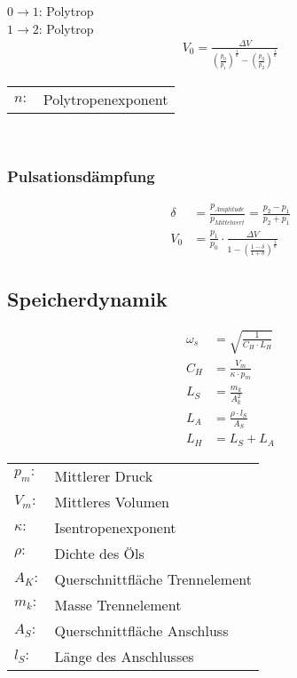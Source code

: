 $0 \rightarrow 1$: Polytrop \\
 $1 \rightarrow 2$: Polytrop
\begin{align*}
V_0 = \frac{\Delta V}{\left( \frac{p_0}{p_1} \right)^{\frac{1}{n}} - \left( \frac{p_0}{p_2} \right)^{\frac{1}{n}}}
\end{align*}

\begin{tabular}{ll}
$n:$ & Polytropenexponent
\end{tabular} \\



\subsubsection{Pulsationsdämpfung}
\begin{align*}
\delta &= \frac{p_{Amplitude}}{p_{Mittelwert}} = \frac{p_2 - p_1}{p_2 + p_1} \\
V_0 &= \frac{p_1}{p_0} \cdot \frac{\Delta V}{1 - \left( \frac{1-\delta}{1+\delta}\right)^{\frac{1}{n}}}
\end{align*}


\subsection{Speicherdynamik}
\begin{align*}
\omega_s &= \sqrt{\frac{1}{C_H \cdot L_H}} \tag{Eigenfrequenz} \\
C_H &= \frac{V_m}{\kappa \cdot p_m} \tag{Speicherkapazität} \\
L_S &= \frac{m_k}{A_k^2} \tag{Speicherinduktivität} \\
L_A &= \frac{\rho \cdot l_S}{A_S} \tag{Anschlussinduktivität} \\
L_H &= L_S + L_A
\end{align*}

\begin{tabular}{ll}
$p_m:$ & Mittlerer Druck \\
$V_m:$ & Mittleres Volumen \\
$\kappa:$ & Isentropenexponent \\
$\rho:$ & Dichte des Öls \\
$A_K:$ & Querschnittfläche Trennelement \\
$m_k:$ & Masse Trennelement \\
$A_S:$ & Querschnittfläche Anschluss \\
$l_S:$ & Länge des Anschlusses
\end{tabular}



\vfill


